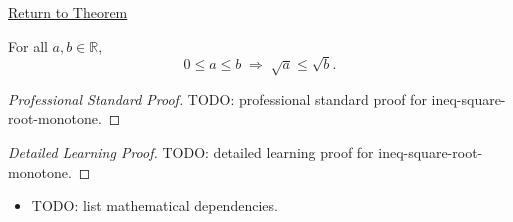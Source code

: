 \newpage
{}
\label{prf:ineq-square-root-monotone}

\begin{remark*}[Return]
\hyperref[thm:ineq-square-root-monotone]{Return to Theorem}
\end{remark*}

\begin{theorem*}
For all $a, b \in \mathbb{R}$,
\[
  0 \le a \le b \;\Rightarrow\; \sqrt{a} \le \sqrt{b}.
\]
\end{theorem*}

\begin{proof}[Professional Standard Proof]
\LRAProofBodyStart
TODO: professional standard proof for ineq-square-root-monotone.
\end{proof}

\begin{proof}[Detailed Learning Proof]
\LRAProofBodyStart
TODO: detailed learning proof for ineq-square-root-monotone.
\end{proof}

\begin{remark*}
\end{remark*}

\begin{dependencies}
\begin{itemize}
  \item TODO: list mathematical dependencies.
\end{itemize}
\end{dependencies}

\clearpage
